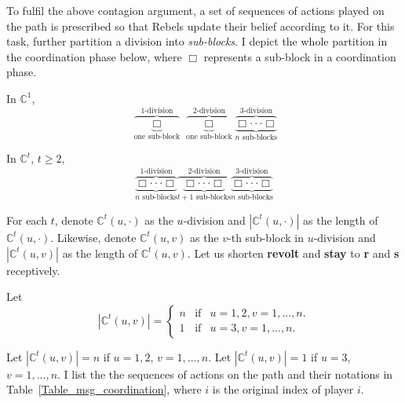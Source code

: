 \documentclass[12pt,letter]{article}
\newcommand{\Kappa}{\mathbb{C}}
\theoremstyle{definition}
\theoremstyle{definition}
\theoremstyle{remark}
\theoremstyle{claim}
\begin{document}
To fulfil the above contagion argument, a set of sequences of actions played on the path is prescribed so that Rebels update their belief according to it. For this task, further partition a division into \textit{sub-blocks}. I depict the whole partition in the coordination phase below, where $\Box$ represents a sub-block in a coordination phase. 

In $\Kappa^1$, 
\[\overbrace{\underbrace{ \Box }_{\text{one sub-block}}}^{\text{$1$-division}} \overbrace{\underbrace{\Box }_{\text{one sub-block}}}^{\text{$2$-division}} \overbrace{\underbrace{\Box \cdot \cdot \cdot \Box}_{\text{$n$ sub-blocks}}}^{\text{$3$-division}}\] 

In $\Kappa^t$, $t\geq 2$,
\[\overbrace{\underbrace{\Box \cdot \cdot \cdot \Box}_{\text{$n$ sub-blocks}}}^{\text{$1$-division}} \overbrace{\underbrace{\Box \cdot \cdot \cdot \Box}_{\text{$t+1$ sub-blocks}} }^{\text{$2$-division}} \overbrace{\underbrace{\Box \cdot \cdot \cdot \Box}_{\text{$n$ sub-blocks}}}^{\text{$3$-division}}\] 




For each $t$, denote $\Kappa^t(u,\cdot)$ as the $u$-division and $|\Kappa^t(u,\cdot) |$ as the length of $\Kappa^t(u,\cdot)$. Likewise, denote $\Kappa^t(u,v)$ as the $v$-th sub-block in $u$-division and $|\Kappa^t(u,v) |$ as the length of $\Kappa^t(u,v)$. Let us shorten \textbf{revolt} and \textbf{stay} to \textbf{r} and \textbf{s} receptively. 

Let
\[
    |\Kappa^t(u,v)|=\left\{
                \begin{array}{lcl}
                  n & \text{if} & u=1,2, v=1,...,n.\\
                 1 & \text{if} & u=3, v=1,...,n.
                \end{array}
              \right. 
\]


Let $|\Kappa^t(u,v)|=n$ if $u=1,2$, $v=1,...,n$. Let $|\Kappa^t(u,v)|=1$ if $u=3$, $v=1,...,n$. I list the the sequences of actions on the path and their notations in Table~\ref{Table_msg_coordination}, where $i$ is the original index of player $i$.
\end{document}
